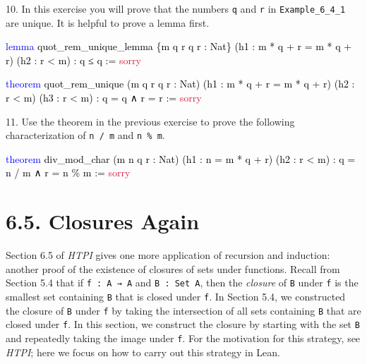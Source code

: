 \documentclass[
  letterpaper,
  DIV=11,
  numbers=noendperiod]{scrreprt}
\newenvironment{Shaded}{\begin{snugshade}}{\end{snugshade}}
\newcommand{\ConstantTok}[1]{\textcolor[rgb]{0.56,0.35,0.01}{#1}}
\newcommand{\KeywordTok}[1]{\textcolor[rgb]{0.00,0.23,0.31}{#1}}
\newcommand{\NormalTok}[1]{\textcolor[rgb]{0.00,0.23,0.31}{#1}}
\renewcommand{\NormalTok}[1]{\textcolor[HTML]{000000}{#1}}
\renewcommand{\KeywordTok}[1]{\textcolor[HTML]{0000FF}{#1}}
\renewcommand{\ConstantTok}[1]{\textcolor[HTML]{DC143C}{#1}}
\theoremstyle{remark}
\begin{document}
10. In this exercise you will prove that the numbers \texttt{q} and
\texttt{r} in \texttt{Example\_6\_4\_1} are unique. It is helpful to
prove a lemma first.

\begin{Shaded}
\begin{Highlighting}[]
\KeywordTok{lemma}\NormalTok{ quot\_rem\_unique\_lemma \{m q r q\textquotesingle{} r\textquotesingle{} : Nat\}}
\NormalTok{    (h1 : m * q + r = m * q\textquotesingle{} + r\textquotesingle{}) (h2 : r\textquotesingle{} \textless{} m) : q ≤ q\textquotesingle{} := }\ConstantTok{sorry}

\KeywordTok{theorem}\NormalTok{ quot\_rem\_unique (m q r q\textquotesingle{} r\textquotesingle{} : Nat)}
\NormalTok{    (h1 : m * q + r = m * q\textquotesingle{} + r\textquotesingle{}) (h2 : r \textless{} m) (h3 : r\textquotesingle{} \textless{} m) :}
\NormalTok{    q = q\textquotesingle{} ∧ r = r\textquotesingle{} := }\ConstantTok{sorry}
\end{Highlighting}
\end{Shaded}

11. Use the theorem in the previous exercise to prove the following
characterization of \texttt{n\ /\ m} and \texttt{n\ \%\ m}.

\begin{Shaded}
\begin{Highlighting}[]
\KeywordTok{theorem}\NormalTok{ div\_mod\_char (m n q r : Nat)}
\NormalTok{    (h1 : n = m * q + r) (h2 : r \textless{} m) : q = n / m ∧ r = n \% m := }\ConstantTok{sorry}
\end{Highlighting}
\end{Shaded}

\hypertarget{closures-again}{%
\section{6.5. Closures Again}\label{closures-again}}

Section 6.5 of \emph{HTPI} gives one more application of recursion and
induction: another proof of the existence of closures of sets under
functions. Recall from Section 5.4 that if \texttt{f\ :\ A\ →\ A} and
\texttt{B\ :\ Set\ A}, then the \emph{closure} of \texttt{B} under
\texttt{f} is the smallest set containing \texttt{B} that is closed
under \texttt{f}. In Section 5.4, we constructed the closure of
\texttt{B} under \texttt{f} by taking the intersection of all sets
containing \texttt{B} that are closed under \texttt{f}. In this section,
we construct the closure by starting with the set \texttt{B} and
repeatedly taking the image under \texttt{f}. For the motivation for
this strategy, see \emph{HTPI}; here we focus on how to carry out this
strategy in Lean.
\end{document}
